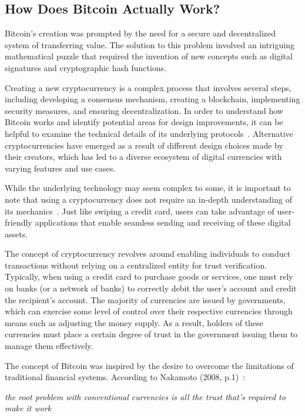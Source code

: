 \subsection{How Does Bitcoin Actually Work?}
Bitcoin's creation was prompted by the need for a secure and decentralized system of transferring value. The solution to this problem involved
an intriguing mathematical puzzle that required the invention of new concepts such as digital signatures and cryptographic hash functions.

Creating a new cryptocurrency is a complex process that involves several steps, including developing a consensus mechanism, creating a
blockchain, implementing security measures, and ensuring decentralization. In order to understand how Bitcoin works and identify potential
areas for design improvements, it can be helpful to examine the technical details of its underlying protocols~\cite{nakamoto2008bitcoin}.
Alternative cryptocurrencies have emerged as a result of different design choices made by their creators, which has led to a diverse
ecosystem of digital currencies with varying features and use cases.

While the underlying technology may seem complex to some, it is important to note that using a cryptocurrency does not require an in-depth
understanding of its mechanics~\cite{barski2014bitcoin}. Just like swiping a credit card, users can take advantage of user-friendly applications
that enable seamless sending and receiving of these digital assets.

The concept of cryptocurrency revolves around enabling individuals to conduct transactions without relying on a centralized entity for trust
verification. Typically, when using a credit card to purchase goods or services, one must rely on banks (or a network of banks) to correctly
debit the user's account and credit the recipient's account. The majority of currencies are issued by governments, which can exercise some
level of control over their respective currencies through means such as adjusting the money supply. As a result,
holders of these currencies must place a certain degree of trust in the government issuing them to manage them effectively.

The concept of Bitcoin was inspired by the desire to overcome the limitations of traditional financial systems. According to Nakamoto
(2008, p.1)~\cite{nakamoto2008bitcoin}:

\begin{displayquote}
    \textit{the root problem with conventional currencies is all the trust that's required to make it work}
\end{displayquote}

